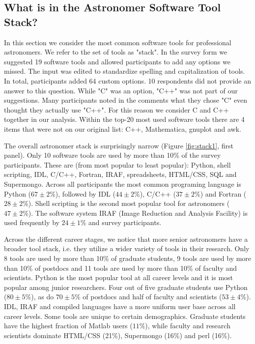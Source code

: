 
\subsection{What is in the Astronomer Software Tool Stack?}

In this section we consider the most common software tools for professional astronomers. We refer to the set of tools as "stack". In the survey form we suggested 19 software tools and allowed participants to add any options we missed. The input was edited to standardize spelling and capitalization of tools. In total, participants added 64 custom options. 10 respondents did not provide an answer to this question. While "C" was an option, "C++" was not part of our suggestions. Many participants noted in the comments what they chose "C" even thought they actually use "C++". For this reason we consider C and C++ together in our analysis. Within the top-20 most used software tools there are 4 items that were not on our original list: C++, Mathematica, gnuplot and awk.

The overall astronomer stack is surprisingly narrow (Figure \ref{fig:stack1}, first panel). Only 10 software tools are used by more than 10\% of the survey participants. These are (from most popular to least popular): Python, shell scripting, IDL, C/C++, Fortran, IRAF, spreadsheets, HTML/CSS, SQL and Supermongo. Across all participants the most common programing language is Python ($67\pm2\%$), followed by IDL ($44\pm2\%$), C/C++ ($37\pm2\%$) and Fortran ($28\pm2\%$). Shell scripting is the second most popular tool for astronomers ($47\pm2\%$). The software system IRAF (Image Reduction and Analysis Facility) is used frequently by $24\pm1\%$ and survey participants. 

Across the different career stages, we notice that more senior astronomers have a broader tool stack, i.e. they utilize a wider variety of tools in their research. Only 8 tools are used by more than 10\% of graduate students, 9 tools are used by more than 10\% of postdocs and 11 tools are used by more than 10\% of faculty and scientists. Python is the most popular tool at all career levels and it is most popular among junior researchers. Four out of five graduate students use Python ($80\pm5\%$), as do $70\pm5\%$ of postdocs and half of faculty and scientists ($53\pm4\%$). IDL, IRAF and compiled languages have a more uniform user base across all career levels. Some tools are unique to certain demographics. Graduate students have the highest fraction of Matlab users ($11\%$), while faculty and research scientists dominate HTML/CSS (21\%), Supermongo (16\%) and perl (16\%).

